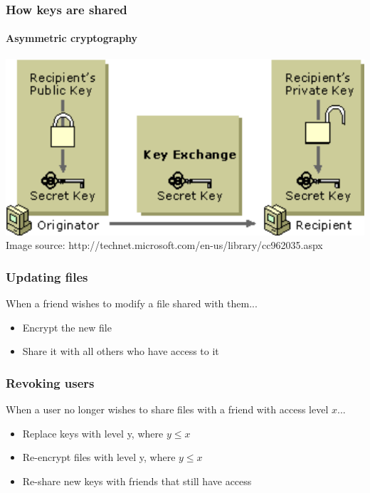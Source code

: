 \documentclass{beamer}
\begin{document}
  \begin{frame}
  	\frametitle{How keys are shared}
  	\framesubtitle{Asymmetric cryptography}
  	\vspace*{1cm}
  	\begin{center}
  		\includegraphics[scale=0.65]{images/publicKey/rsaKeyExchange.pdf}
  		\vspace*{2cm} \\
  	\tiny{Image source: http://technet.microsoft.com/en-us/library/cc962035.aspx}
  	\end{center}
  \end{frame}
  
  \begin{frame}
  	\frametitle{Updating files}
  	When a friend wishes to modify a file shared with them...
  	\begin{itemize}
		\item Encrypt the new file
		\item Share it with all others who have access to it
	\end{itemize}
  \end{frame}
  
  
  \begin{frame}
	\frametitle{Revoking users}
	When a user no longer wishes to share files with a friend with access level $x$...
	\begin{itemize}
		\item Replace keys with level y, where $y \leq x$
		\item Re-encrypt files with level y, where $y \leq x$
		\item Re-share new keys with friends that still have access
	\end{itemize}
  \end{frame} 
  
\end{document}
